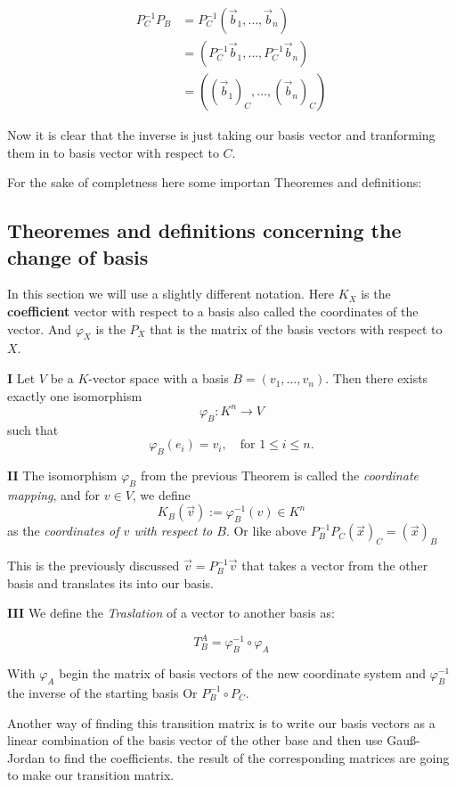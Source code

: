 \begin{align*}
P_{C}^{-1} P_B &= P_{C}^{-1}(\vec{b}_1, \dots, \vec{b}_n) \\
&= (P_{C}^{-1}\vec{b}_1, \dots, P_{C}^{-1}\vec{b}_n)\\
&= ((\vec{b}_1)_C, \dots, (\vec{b}_n)_C)
\end{align*}

Now it is clear that the inverse is just taking our basis vector and tranforming
them in to basis vector with respect to \(C\).

For the sake of completness here some importan Theoremes and definitions:

\subsection{Theoremes and definitions concerning the change of basis}

In this section we will use a slightly different notation. Here \(K_X\) is 
the \textbf{coefficient} vector with respect to a basis also called the coordinates
of the vector. And \(\varphi_X\) is the \(P_X\) that is the matrix of the basis vectors with
respect to \(X\).

\textbf{I} Let \( V \) be a \( K \)-vector space with a 
basis \( B = (v_1, \ldots, v_n) \).  
Then there exists exactly one isomorphism 
\[
\varphi_B : K^n \to V
\]
such that
\[
\varphi_B(e_i) = v_i, \quad \text{for } 1 \leq i \leq n.
\]

\textbf{II} The isomorphism \( \varphi_B \) from the previous 
Theorem is called the \emph{coordinate mapping},  
and for \( v \in V \), we define
\[
K_B (\vec{v}) := \varphi_B^{-1} (v) \in K^n
\]
as the \emph{coordinates of \( v \) with respect to \( B \)}. Or like above 
\(P_{B}^{-1} P_C (\vec{x})_C = (\vec{x})_B\)

This is the previously discussed \(\vec{v} = P_{B}^{-1} \vec{v}\) 
that takes a vector from the other basis and translates its into our basis.
 
\textbf{III} We define the \emph{Traslation} of a vector to another
basis as:

\[
T_{B}^{A} = \varphi_{B}^{-1} \circ \varphi_A
\]

With \(\varphi_A\) begin the matrix of basis vectors of the new coordinate
system and \(\varphi_{B}^{-1}\) the inverse of the starting basis 
Or \(P_{B}^{-1} \circ P_C\).

Another way of finding this transition matrix is to write our basis vectors as a linear
combination of the basis vector of the other base and then use Gauß-Jordan to find the coefficients.
the result of the corresponding matrices are going to make our transition matrix.

